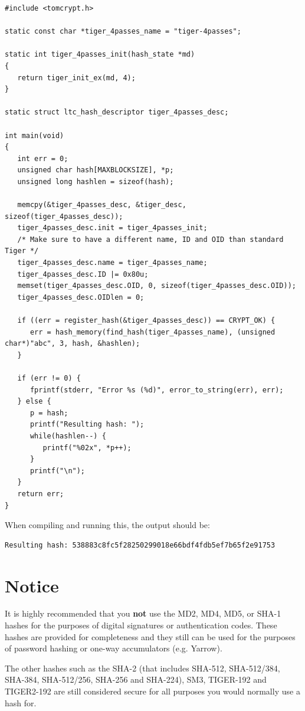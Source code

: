 \documentclass[synpaper]{book}
\newcommand{\mysection}[1]    %
	{                   %
	\section{#1}
   \markboth{\textsf{www.libtom.net}}{\thesection ~ {#1}}
	}
\begin{document}
\begin{small}
\begin{verbatim}
#include <tomcrypt.h>

static const char *tiger_4passes_name = "tiger-4passes";

static int tiger_4passes_init(hash_state *md)
{
   return tiger_init_ex(md, 4);
}

static struct ltc_hash_descriptor tiger_4passes_desc;

int main(void)
{
   int err = 0;
   unsigned char hash[MAXBLOCKSIZE], *p;
   unsigned long hashlen = sizeof(hash);

   memcpy(&tiger_4passes_desc, &tiger_desc, sizeof(tiger_4passes_desc));
   tiger_4passes_desc.init = tiger_4passes_init;
   /* Make sure to have a different name, ID and OID than standard Tiger */
   tiger_4passes_desc.name = tiger_4passes_name;
   tiger_4passes_desc.ID |= 0x80u;
   memset(tiger_4passes_desc.OID, 0, sizeof(tiger_4passes_desc.OID));
   tiger_4passes_desc.OIDlen = 0;

   if ((err = register_hash(&tiger_4passes_desc)) == CRYPT_OK) {
      err = hash_memory(find_hash(tiger_4passes_name), (unsigned char*)"abc", 3, hash, &hashlen);
   }

   if (err != 0) {
      fprintf(stderr, "Error %s (%d)", error_to_string(err), err);
   } else {
      p = hash;
      printf("Resulting hash: ");
      while(hashlen--) {
         printf("%02x", *p++);
      }
      printf("\n");
   }
   return err;
}
\end{verbatim}
\end{small}

When compiling and running this, the output should be:

\begin{verbatim}
Resulting hash: 538883c8fc5f28250299018e66bdf4fdb5ef7b65f2e91753
\end{verbatim}

\mysection{Notice}
It is highly recommended that you \textbf{not} use the MD2, MD4, MD5, or SHA-1 hashes for the purposes of digital signatures or authentication codes.
These hashes are provided for completeness and they still can be used for the purposes of password hashing or one-way accumulators
(e.g. Yarrow).

The other hashes such as the SHA-2 (that includes SHA-512, SHA-512/384, SHA-384, SHA-512/256, SHA-256 and SHA-224), SM3, TIGER-192 and TIGER2-192 are still
considered secure for all purposes you would normally use a hash for.
\end{document}
